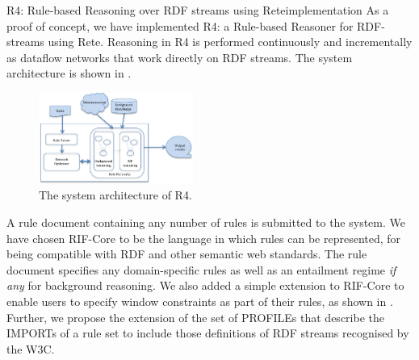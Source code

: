 \begin{nestedsection}{R4: Rule-based Reasoning over RDF streams using Rete}{implementation}
	As a proof of concept, we have implemented R4: a Rule-based Reasoner for RDF-streams using Rete.
	Reasoning in R4 is performed continuously and incrementally as dataflow networks that work directly on RDF streams.
	The system architecture is shown in .
	\begin{figure}[b]
		\centering
		\includegraphics[width=0.45\textwidth]{R4-architecture.png}
		\caption{The system architecture of R4.}
	\end{figure}

	A rule document containing any number of rules is submitted to the system.
	We have chosen RIF-Core to be the language in which rules can be represented, for being compatible with RDF and other semantic web standards.
	The rule document specifies any domain-specific rules as well as an entailment regime \emph{if any} for background reasoning.
	We also added a simple extension to RIF-Core to enable users to specify window constraints as part of their rules, as shown in .
	Further, we propose the extension of the set of PROFILEs that describe the IMPORTs of a rule set to include those definitions of RDF streams recognised by the W3C.


\end{nestedsection}
